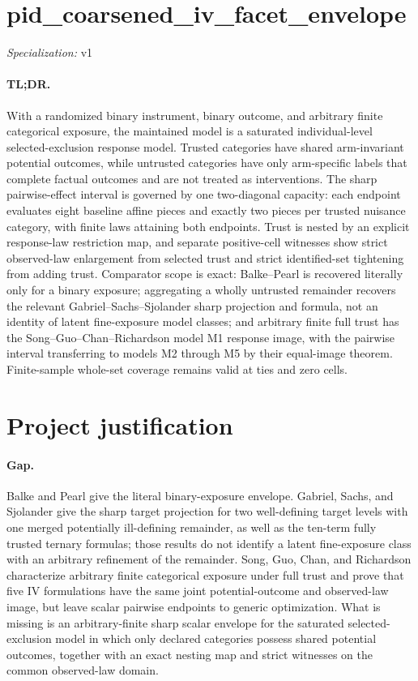 \documentclass{article}
\begin{document}
\sloppy

\section*{pid\_\allowbreak{}coarsened\_\allowbreak{}iv\_\allowbreak{}facet\_\allowbreak{}envelope}

\noindent\textit{Specialization:} v1\par

\paragraph{TL;DR.} With a randomized binary instrument, binary outcome, and arbitrary finite categorical exposure, the maintained model is a saturated individual-level selected-exclusion response model. Trusted categories have shared arm-invariant potential outcomes, while untrusted categories have only arm-specific labels that complete factual outcomes and are not treated as interventions. The sharp pairwise-effect interval is governed by one two-diagonal capacity: each endpoint evaluates eight baseline affine pieces and exactly two pieces per trusted nuisance category, with finite laws attaining both endpoints. Trust is nested by an explicit response-law restriction map, and separate positive-cell witnesses show strict observed-law enlargement from selected trust and strict identified-set tightening from adding trust. Comparator scope is exact: Balke--Pearl is recovered literally only for a binary exposure; aggregating a wholly untrusted remainder recovers the relevant Gabriel--Sachs--Sjolander sharp projection and formula, not an identity of latent fine-exposure model classes; and arbitrary finite full trust has the Song--Guo--Chan--Richardson model M1 response image, with the pairwise interval transferring to models M2 through M5 by their equal-image theorem. Finite-sample whole-set coverage remains valid at ties and zero cells.

\section{Project justification}

\paragraph{Gap.} Balke and Pearl give the literal binary-exposure envelope. Gabriel, Sachs, and Sjolander give the sharp target projection for two well-defining target levels with one merged potentially ill-defining remainder, as well as the ten-term fully trusted ternary formulas; those results do not identify a latent fine-exposure class with an arbitrary refinement of the remainder. Song, Guo, Chan, and Richardson characterize arbitrary finite categorical exposure under full trust and prove that five IV formulations have the same joint potential-outcome and observed-law image, but leave scalar pairwise endpoints to generic optimization. What is missing is an arbitrary-finite sharp scalar envelope for the saturated selected-exclusion model in which only declared categories possess shared potential outcomes, together with an exact nesting map and strict witnesses on the common observed-law domain.
\end{document}
